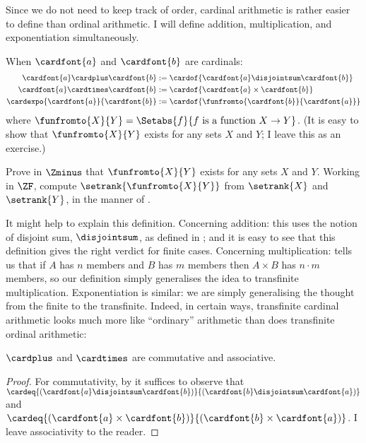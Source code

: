 \documentclass[../../../include/open-logic-section]{subfiles}
\begin{document}
Since we do not need to keep track of order, cardinal arithmetic is rather easier to define than ordinal arithmetic. I will define addition, multiplication, and exponentiation simultaneously. 
\begin{defn}When $\cardfont{a}$ and $\cardfont{b}$ are cardinals:
	\begin{align*}
	\cardfont{a} \cardplus \cardfont{b} &:= \cardof{\cardfont{a} \disjointsum \cardfont{b}}\\
	\cardfont{a} \cardtimes \cardfont{b} &:= \cardof{\cardfont{a} \times \cardfont{b}}\\
	\cardexpo{\cardfont{a}}{\cardfont{b}} &:= \cardof{\funfromto{\cardfont{b}}{\cardfont{a}}}
	\end{align*}
	where $\funfromto{X}{Y} = \Setabs{f}{f\text{ is a function }X \to Y}$. (It is easy to show that $\funfromto{X}{Y}$ exists for any sets $X$ and $Y$; I leave this as an exercise.) 
\end{defn}
\begin{prob}
	Prove in $\Zminus$ that $\funfromto{X}{Y}$ exists for any sets $X$ and $Y$. Working in $\ZF$, compute $\setrank{\funfromto{X}{Y}}$ from $\setrank{X}$ and $\setrank{Y}$, in the manner of . 
\end{prob}\noindent
It might help to explain this definition. Concerning addition: this uses the notion of disjoint sum, $\disjointsum$, as defined in ; and it is easy to see that this definition gives the right verdict for finite cases. Concerning multiplication:  tells us that if $A$ has $n$ members and $B$ has $m$ members then $A \times B$ has $n \cdot m$ members, so our definition simply generalises the idea to transfinite multiplication. Exponentiation is similar: we are simply generalising the thought from the finite to the transfinite. Indeed, in certain ways, transfinite cardinal arithmetic looks much more like ``ordinary'' arithmetic than does transfinite ordinal arithmetic:
\begin{prop} $\cardplus$ and $\cardtimes$ are commutative and associative. 
\end{prop}
\begin{proof}
	For commutativity, by  it suffices to observe that $\cardeq{(\cardfont{a} \disjointsum \cardfont{b})}{(\cardfont{b} \disjointsum \cardfont{a})}$ and $\cardeq{(\cardfont{a} \times \cardfont{b})}{(\cardfont{b} \times \cardfont{a})}$. I leave associativity to the reader.
\end{proof}
\end{document}
